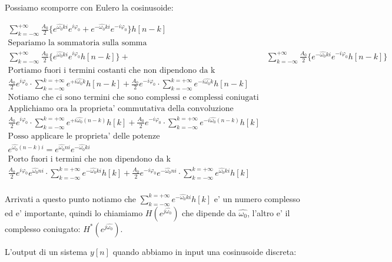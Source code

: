 Possiamo scomporre con Eulero la cosinusoide:

\[\begin{split}
    \sum_{k = -\infty}^{+\infty} \frac{A_0}{2} \{ e^{\hat{\omega_0} k i} e^{i \varphi_0} + e^{- \hat{\omega_0} k i} e^{- i \varphi_0} \} h[n-k]\\
    \mbox{Separiamo la sommatoria sulla somma} \\
    \sum_{k = -\infty}^{+\infty} \frac{A_0}{2} \{ e^{\hat{\omega_0} k i} e^{i \varphi_0} h[n-k] \} + &\sum_{k = -\infty}^{+\infty} \frac{A_0}{2} \{ e^{- \hat{\omega_0} k i} e^{- i \varphi_0} h[n-k] \} \\
    \mbox{Portiamo fuori i termini costanti che non dipendono da k} \\
    \frac{A_0}{2} e^{i \varphi_0} \cdot \sum_{k = -\infty}^{k = +\infty} e^{+i \hat{\omega_0}k} h[n-k] + \frac{A_0}{2} e^{-i \varphi_0} \cdot \sum_{k = -\infty}^{k = +\infty} e^{-i \hat{\omega_0}k} h[n-k] \\
    \mbox{Notiamo che ci sono termini che sono complessi e complessi coniugati} \\
    \mbox{Applichiamo ora la proprieta' commutativa della convoluzione} \\
    \frac{A_0}{2} e^{i \varphi_0} \cdot \sum_{k = -\infty}^{k = +\infty} e^{+i \hat{\omega_0}(n-k)} h[k] + \frac{A_0}{2} e^{-i \varphi_0} \cdot \sum_{k = -\infty}^{k = +\infty} e^{-i \hat{\omega_0}(n-k)} h[k] \\
    \mbox{Posso applicare le proprieta' delle potenze} \\
    e^{\hat{\omega_0}(n-k)i} = e^{\hat{\omega_0} n i} e^{-\hat{\omega_0} k i} \\
    \mbox{Porto fuori i termini che non dipendono da k} \\
    \frac{A_0}{2} e^{i \varphi_0} e^{\hat{\omega_0}n i} \cdot \sum_{k = -\infty}^{k = +\infty} e^{-\hat{\omega_0}k i} h[k] + \frac{A_0}{2} e^{-i \varphi_0} e^{-\hat{\omega_0} n i} \cdot \sum_{k = -\infty}^{k = +\infty} e^{\hat{\omega_0} k i} h[k] \\
\end{split}\]

Arrivati a questo punto notiamo che $\sum_{k = -\infty}^{k = +\infty} e^{-\hat{\omega_0}k i} h[k]$ e' un numero complesso ed e' importante, quindi lo chiamiamo $H(e^{j \hat{\omega_0}})$ che dipende da $\hat{\omega_0}$, l'altro e' il complesso coniugato: $H^*(e^{j \hat{\omega_0}})$.

L'output di un sistema $y[n]$ quando abbiamo in input una cosinusoide discreta:

